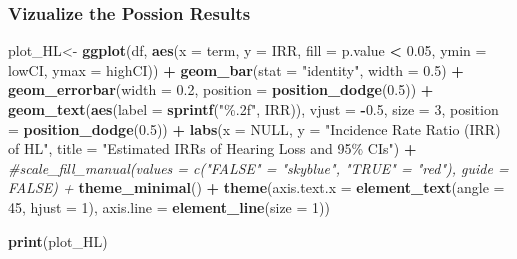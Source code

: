 \documentclass[
]{article}
\newenvironment{Shaded}{\begin{snugshade}}{\end{snugshade}}
\newcommand{\AttributeTok}[1]{\textcolor[rgb]{0.13,0.29,0.53}{#1}}
\newcommand{\CommentTok}[1]{\textcolor[rgb]{0.56,0.35,0.01}{\textit{#1}}}
\newcommand{\ConstantTok}[1]{\textcolor[rgb]{0.56,0.35,0.01}{#1}}
\newcommand{\DecValTok}[1]{\textcolor[rgb]{0.00,0.00,0.81}{#1}}
\newcommand{\FloatTok}[1]{\textcolor[rgb]{0.00,0.00,0.81}{#1}}
\newcommand{\FunctionTok}[1]{\textcolor[rgb]{0.13,0.29,0.53}{\textbf{#1}}}
\newcommand{\NormalTok}[1]{#1}
\newcommand{\OtherTok}[1]{\textcolor[rgb]{0.56,0.35,0.01}{#1}}
\newcommand{\SpecialCharTok}[1]{\textcolor[rgb]{0.81,0.36,0.00}{\textbf{#1}}}
\newcommand{\StringTok}[1]{\textcolor[rgb]{0.31,0.60,0.02}{#1}}
\begin{document}
\hypertarget{vizualize-the-possion-results}{%
\subsubsection{Vizualize the Possion
Results}\label{vizualize-the-possion-results}}

\begin{Shaded}
\begin{Highlighting}[]
\NormalTok{plot\_HL}\OtherTok{\textless{}{-}} \FunctionTok{ggplot}\NormalTok{(df, }\FunctionTok{aes}\NormalTok{(}\AttributeTok{x =}\NormalTok{ term, }\AttributeTok{y =}\NormalTok{ IRR, }\AttributeTok{fill =}\NormalTok{ p.value }\SpecialCharTok{\textless{}} \FloatTok{0.05}\NormalTok{, }\AttributeTok{ymin =}\NormalTok{ lowCI, }\AttributeTok{ymax =}\NormalTok{ highCI)) }\SpecialCharTok{+}
  \FunctionTok{geom\_bar}\NormalTok{(}\AttributeTok{stat =} \StringTok{"identity"}\NormalTok{, }\AttributeTok{width =} \FloatTok{0.5}\NormalTok{) }\SpecialCharTok{+}
  \FunctionTok{geom\_errorbar}\NormalTok{(}\AttributeTok{width =} \FloatTok{0.2}\NormalTok{, }\AttributeTok{position =} \FunctionTok{position\_dodge}\NormalTok{(}\FloatTok{0.5}\NormalTok{)) }\SpecialCharTok{+}
  \FunctionTok{geom\_text}\NormalTok{(}\FunctionTok{aes}\NormalTok{(}\AttributeTok{label =} \FunctionTok{sprintf}\NormalTok{(}\StringTok{"\%.2f"}\NormalTok{, IRR)), }\AttributeTok{vjust =} \SpecialCharTok{{-}}\FloatTok{0.5}\NormalTok{, }\AttributeTok{size =} \DecValTok{3}\NormalTok{, }\AttributeTok{position =} \FunctionTok{position\_dodge}\NormalTok{(}\FloatTok{0.5}\NormalTok{)) }\SpecialCharTok{+}
  \FunctionTok{labs}\NormalTok{(}\AttributeTok{x =} \ConstantTok{NULL}\NormalTok{, }\AttributeTok{y =} \StringTok{"Incidence Rate Ratio (IRR) of HL"}\NormalTok{, }\AttributeTok{title =} \StringTok{"Estimated IRRs of Hearing Loss and 95\% CIs"}\NormalTok{) }\SpecialCharTok{+}
  \CommentTok{\#scale\_fill\_manual(values = c("FALSE" = "skyblue", "TRUE" = "red"), guide = FALSE) +}
  \FunctionTok{theme\_minimal}\NormalTok{() }\SpecialCharTok{+}
  \FunctionTok{theme}\NormalTok{(}\AttributeTok{axis.text.x =} \FunctionTok{element\_text}\NormalTok{(}\AttributeTok{angle =} \DecValTok{45}\NormalTok{, }\AttributeTok{hjust =} \DecValTok{1}\NormalTok{),}
        \AttributeTok{axis.line =} \FunctionTok{element\_line}\NormalTok{(}\AttributeTok{size =} \DecValTok{1}\NormalTok{))}

\FunctionTok{print}\NormalTok{(plot\_HL)}
\end{Highlighting}
\end{Shaded}
\end{document}
